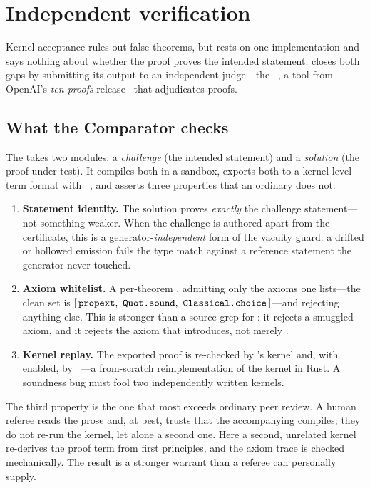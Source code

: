 \section{Independent verification}
\label{sec:indep}

Kernel acceptance rules out false theorems, but rests on one implementation and
says nothing about whether the proof proves the intended statement. \Telperion{}
closes both gaps by submitting its output to an independent judge---the
\Comparator~\cite{comparator}, a tool from OpenAI's \emph{ten-proofs}
release~\cite{tenproofs} that adjudicates \Lean{} proofs.

\subsection{What the Comparator checks}

The \Comparator{} takes two \Lean{} modules: a \emph{challenge} (the intended
statement) and a \emph{solution} (the proof under test). It compiles both in a
sandbox, exports both to a kernel-level term format with
~\cite{lean4export}, and asserts three properties that an
ordinary  does not:
\begin{enumerate}[nosep,leftmargin=1.4em]
  \item \textbf{Statement identity.} The solution proves \emph{exactly} the
    challenge statement---not something weaker. When the challenge is authored
    apart from the certificate, this is a generator-\emph{independent} form of the
    vacuity guard: a drifted or hollowed emission fails the type match against a
    reference statement the generator never touched.
  \item \textbf{Axiom whitelist.} A per-theorem , admitting
    only the axioms one lists---the clean set is
    $[\,\code{propext},\ \code{Quot.sound},\ \code{Classical.choice}\,]$---and
    rejecting anything else. This is stronger than a source grep for :
    it rejects a smuggled axiom, and it rejects the  axiom that
     introduces, not merely .
  \item \textbf{Kernel replay.} The exported proof is re-checked by \Lean's kernel
    and, with \nanoda{} enabled, by \nanoda~\cite{nanoda}---a from-scratch
    reimplementation of the \Lean{} kernel in Rust. A soundness bug must fool two
    independently written kernels.
\end{enumerate}
The third property is the one that most exceeds ordinary peer review. A human
referee reads the prose and, at best, trusts that the accompanying \Lean{}
compiles; they do not re-run the kernel, let alone a second one. Here a second,
unrelated kernel re-derives the proof term from first principles, and the axiom
trace is checked mechanically. The result is a stronger warrant than a referee can
personally supply.

